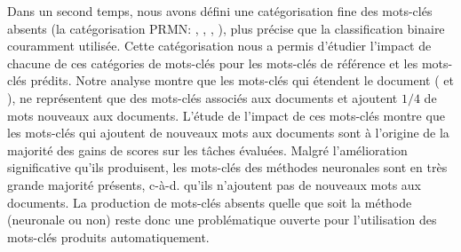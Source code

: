 Dans un second temps, nous avons défini une catégorisation fine des mots-clés absents (la catégorisation PRMN: \present{}, \reordonne{}, \mixte{}, \nonvu{}), plus précise que la classification binaire couramment utilisée.
Cette catégorisation nous a permis d'étudier l'impact de chacune de ces catégories de mots-clés pour les mots-clés de référence et les mots-clés prédits.
Notre analyse montre que les mots-clés qui étendent le document (\mixtes{} et \nonvus{}), ne représentent que  des mots-clés associés aux documents et ajoutent $1/4$ de mots nouveaux aux documents.
L'étude de l'impact de ces mots-clés montre que les mots-clés qui ajoutent de nouveaux mots aux documents sont à l'origine de la majorité des gains de scores sur les tâches évaluées.
Malgré l'amélioration significative qu'ils produisent, les mots-clés des méthodes neuronales sont en très grande majorité présents, c-à-d. qu'ils n'ajoutent pas de nouveaux mots aux documents.
La production de mots-clés absents quelle que soit la méthode (neuronale ou non) reste donc une problématique ouverte pour l'utilisation des mots-clés produits automatiquement.



